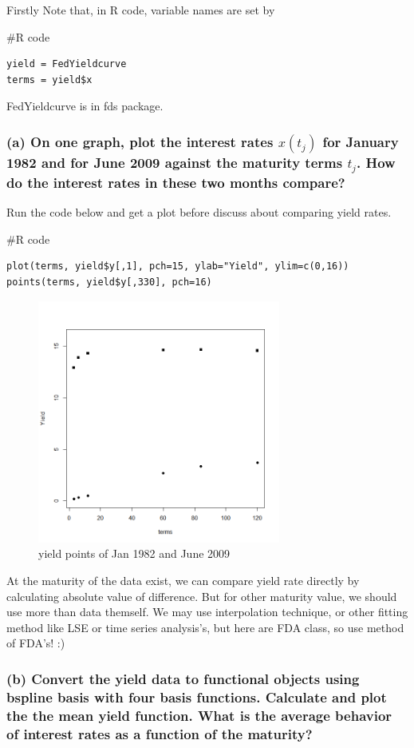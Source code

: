 \documentclass{article}
\newenvironment{Rcode}%
{%
    \begin{mdframed}
    \#R code
    \begin{small}
}
{%
    \end{small}
    \end{mdframed}
}
\begin{document}
Firstly Note that, in R code, variable names are set by
\begin{Rcode}
    \begin{verbatim}
yield = FedYieldcurve
terms = yield$x
    \end{verbatim}
\end{Rcode}
FedYieldcurve is in fds package.

\subsubsection*{(a) On one graph, plot the interest rates $x(t_j)$ for January 1982 and for June 2009 against the maturity terms $t_j$. How do the interest rates in these two months compare?}
Run the code below and get a plot before discuss about comparing yield rates.
\begin{Rcode}
    \begin{verbatim}
plot(terms, yield$y[,1], pch=15, ylab="Yield", ylim=c(0,16)) 
points(terms, yield$y[,330], pch=16)
    \end{verbatim}
\end{Rcode}
\begin{figure}[hh]
    \centering
    \includegraphics[height=8cm]{yield_2terms.png}
    \caption{yield points of Jan 1982 and June 2009}
\end{figure}
At the maturity of the data exist, we can compare yield rate directly by calculating absolute value of difference.
But for other maturity value, we should use more than data themself. We may use interpolation technique, or other fitting method like LSE or time series analysis's,
but here are FDA class, so use method of FDA's! :)

\newpage
\subsubsection*{(b) Convert the yield data to functional objects using bspline basis with four basis functions. 
Calculate and plot the the mean yield function. What is the average behavior of interest rates as a function of the maturity?}
\end{document}
